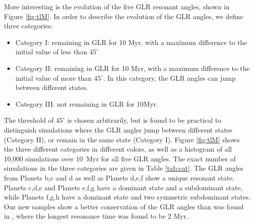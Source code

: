 \documentclass[fleqn,usenatbib]{mnras} %
\begin{document}
More interesting is the evolution of the five GLR resonant angles, shown in Figure \ref{fig:tlM}. In order to describe the evolution of the GLR angles, we define three categories: 
\begin{itemize}
    \item Category I: remaining in GLR for 10 Myr, with a maximum difference to the initial value of less than $45^\circ$
    \item Category II: remaining in GLR for 10 Myr, with a maximum difference to the initial value of more than $45^\circ$. In this category, the GLR angles can jump between different states. 
    \item Category III: not remaining in GLR for 10Myr. 
\end{itemize}
The threshold of $45^\circ$ is chosen arbitrarily, but is found to be practical to distinguish simulations where the GLR angles jump between different states (Category II), or remain in the same state (Category I). Figure \ref{fig:tlM} shows the three different categories in different colors, as well as a histogram of all 10,000 simulations over 10~Myr for all five GLR angles.  The exact number of simulations in the three categories are given in Table \ref{tab:cat}. The GLR angles from Planets b,c and d as well as Planets d,e,f show a unique resonant state. Planets c,d,e and Planets e,f,g have a dominant state and a subdominant state, while Planets f,g,h have a dominant state and two symmetric subdominant states.
Our new samples show a better conservation of the GLR angles than was found in \citep{Grimm2018}, where the longest resonance time was found to be 2 Myr. 


\end{document}
